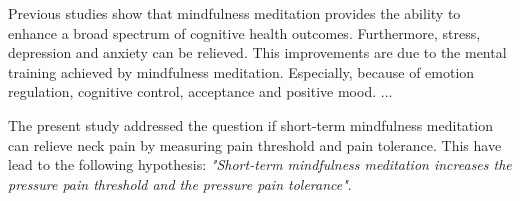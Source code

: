 Previous studies show that mindfulness meditation provides the ability to enhance a broad spectrum of cognitive health outcomes. Furthermore, stress, depression and anxiety can be relieved. This improvements are due to the mental training achieved by mindfulness meditation. Especially, because of emotion regulation, cognitive control, acceptance and positive mood. \cite{Zeidan2012;Zeidan2016} ...

The present study addressed the question if short-term mindfulness meditation can relieve neck pain by measuring pain threshold and pain tolerance. This have lead to the following hypothesis: \textit{"Short-term mindfulness meditation increases the pressure pain threshold and the pressure pain tolerance"}.

